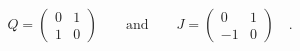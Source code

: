 \begin{equation}
Q= \begin{pmatrix} 0 & 1\\ 1 & 0 \end{pmatrix} \qquad \textrm{and} \qquad 
J= \begin{pmatrix} 0 & 1\\  -1 & 0  \end{pmatrix}  \quad .
\label{eq:qjmatrices}
\end{equation}

